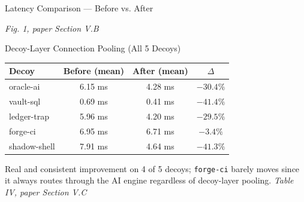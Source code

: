 \documentclass[aspectratio=169, 11pt]{beamer}
\newcommand{\srcnote}[1]{{\footnotesize\color{gray}\textit{#1}}}
\begin{document}
\begin{frame}{Latency Comparison --- Before vs. After}
    \begin{center}
    \end{center}
    \srcnote{Fig. 1, paper Section V.B}
\end{frame}

\begin{frame}{Decoy-Layer Connection Pooling (All 5 Decoys)}
    \scriptsize
    \renewcommand{\arraystretch}{1.2}
    \begin{tabular}{|l|c|c|c|}
        \hline
        \textbf{Decoy} & \textbf{Before (mean)} & \textbf{After (mean)} & \textbf{$\Delta$} \\
        \hline
        oracle-ai & 6.15 ms & 4.28 ms & $-30.4\%$ \\
        \hline
        vault-sql & 0.69 ms & 0.41 ms & $-41.4\%$ \\
        \hline
        ledger-trap & 5.96 ms & 4.20 ms & $-29.5\%$ \\
        \hline
        forge-ci & 6.95 ms & 6.71 ms & $-3.4\%$ \\
        \hline
        shadow-shell & 7.91 ms & 4.64 ms & $-41.3\%$ \\
        \hline
    \end{tabular}
    \vspace{3mm}
    \normalsize
    Real and consistent improvement on 4 of 5 decoys; \texttt{forge-ci} barely moves since it always routes through the AI engine regardless of decoy-layer pooling.
    \srcnote{Table IV, paper Section V.C}
\end{frame}
\end{document}
